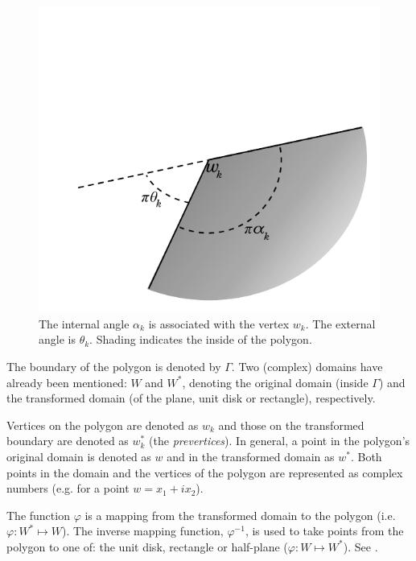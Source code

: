 \begin{figure} [t]
\centering
\includegraphics[scale=0.6]{sc/figs/anglediagram.pdf}
\caption{The internal angle $\alpha_k$ is associated with the vertex $w_k$. The external angle is $\theta_k$. Shading indicates the inside of the polygon.}
\label{anglediagram}
\end{figure}

The boundary of the polygon is denoted by $\Gamma$. Two (complex) domains have already been mentioned: $W$ and $W^*$, denoting the original domain (inside $\Gamma$) and the transformed domain (of the plane, unit disk or rectangle), respectively. 

Vertices on the polygon are denoted as $w_k$ and those on the transformed boundary are denoted as $w^*_k$ (the \emph{prevertices}). In general, a point in the polygon's original domain is denoted as $w$ and in the transformed domain as $w^*$. Both points in the domain and the vertices of the polygon are represented as complex numbers (e.g. for a point $w=x_1+ix_2$).

The function $\varphi$ is a mapping from the transformed domain to the polygon (i.e. $\varphi:W^* \mapsto W$). The inverse mapping function, $\varphi^{-1}$, is used to take points from the polygon to one of: the unit disk, rectangle or half-plane ($\varphi:W \mapsto W^*$).  See .

